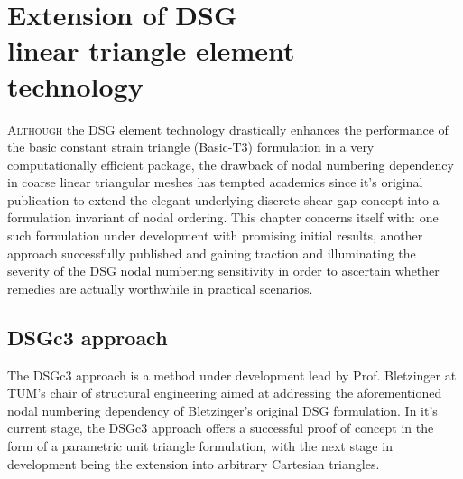 



\chapter[Extension of DSG linear triangle element technology]{Extension of DSG \\ linear triangle element \\ technology}
\label{chap:chapter_dsg_extension}

\renewcommand{\Thema}{Extension of DSG linear triangle element technology}

\lettrine[lines=2]{A}{lthough} the DSG element technology drastically enhances the performance of the basic constant strain triangle (Basic-T3) formulation in a very computationally efficient package, the drawback of nodal numbering dependency in coarse linear triangular meshes has tempted academics since it's original publication to extend the elegant underlying discrete shear gap concept into a formulation invariant of nodal ordering. This chapter concerns itself with: one such formulation under development with promising initial results, another approach successfully published and gaining traction and illuminating the severity of the DSG nodal numbering sensitivity in order to ascertain whether remedies are actually worthwhile in practical scenarios.

\section{DSGc3 approach}
The DSGc3 approach is a method under development lead by Prof. Bletzinger at TUM's chair of structural engineering aimed at addressing the aforementioned nodal numbering dependency of Bletzinger's original DSG formulation. In it's current stage, the DSGc3 approach offers a successful proof of concept in the form of a parametric unit triangle formulation, with the next stage in development being the extension into arbitrary Cartesian triangles. 

